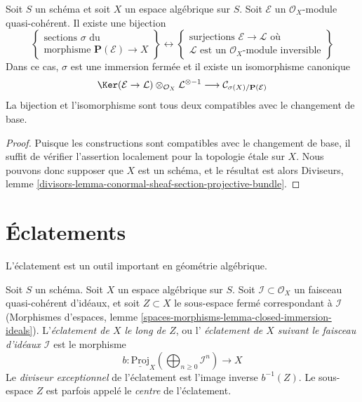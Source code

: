 \begin{lemma}
\label{lemma-conormal-sheaf-section-projective-bundle}
Soit $S$ un schéma et soit $X$ un espace algébrique sur $S$.
Soit $\mathcal{E}$ un $\mathcal{O}_X$-module quasi-cohérent.
Il existe une bijection
$$
\left\{
\begin{matrix}
\text{sections }\sigma\text{ du } \\
\text{morphisme } \mathbf{P}(\mathcal{E}) \to X
\end{matrix}
\right\}
\leftrightarrow
\left\{
\begin{matrix}
\text{surjections }\mathcal{E} \to \mathcal{L}\text{ où} \\
\mathcal{L}\text{ est un }\mathcal{O}_X\text{-module inversible}
\end{matrix}
\right\}
$$
Dans ce cas, $\sigma$ est une immersion fermée et il existe un
isomorphisme canonique
$$
\Ker(\mathcal{E} \to \mathcal{L})
\otimes_{\mathcal{O}_X} \mathcal{L}^{\otimes -1}
\longrightarrow
\mathcal{C}_{\sigma(X)/\mathbf{P}(\mathcal{E})}
$$
La bijection et l'isomorphisme sont tous deux compatibles avec le changement de base.
\end{lemma}

\begin{proof}
Puisque les constructions sont compatibles avec le changement de base, il suffit de
vérifier l'assertion localement pour la topologie \'etale sur $X$. Nous pouvons donc supposer que $X$ est
un schéma, et le résultat est alors
Diviseurs, lemme \ref{divisors-lemma-conormal-sheaf-section-projective-bundle}.
\end{proof}






\section{Éclatements}
\label{section-blowing-up}

\noindent
L'éclatement est un outil important en géométrie algébrique.

\begin{definition}
\label{definition-blow-up}
Soit $S$ un schéma. Soit $X$ un espace algébrique sur $S$.
Soit $\mathcal{I} \subset \mathcal{O}_X$ un faisceau quasi-cohérent
d'idéaux, et soit $Z \subset X$ le sous-espace fermé correspondant
à $\mathcal{I}$
(Morphismes d'espaces, lemme
\ref{spaces-morphisms-lemma-closed-immersion-ideals}).
L'{\it éclatement de $X$ le long de $Z$}, ou l'
{\it éclatement de $X$ suivant le faisceau d'idéaux $\mathcal{I}$} est
le morphisme
$$
b :
\underline{\text{Proj}}_X
\left(\bigoplus\nolimits_{n \geq 0} \mathcal{I}^n\right)
\longrightarrow
X
$$
Le {\it diviseur exceptionnel} de l'éclatement est l'image inverse
$b^{-1}(Z)$. Le sous-espace $Z$ est parfois appelé le {\it centre} de l'éclatement.
\end{definition}

